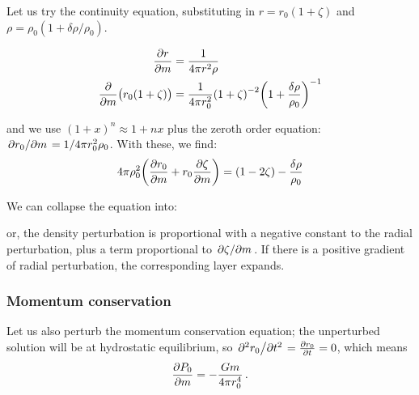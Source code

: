 \documentclass[main.tex]{subfiles}
\begin{document}
Let us try the continuity equation, substituting in \(r = r_0 (1+\zeta)\) and \(\rho = \rho_0 (1 + \delta \rho / \rho_0)\).

\begin{subequations}
\begin{align}
  \pdv{r}{m} &= \frac{1}{4 \pi r^2 \rho }  \\
  \pdv{}{m} \qty(r_0 (1+\zeta)) &=
  \frac{1}{4 \pi r_0^2} \qty(1+\zeta)^{-2} \qty(1 + \frac{\delta \rho}{\rho_0})^{-1}
\end{align}
\end{subequations}

and we use \((1+x)^n \approx 1 + nx\) plus the zeroth order equation: \(\pdv*{r_0 }{m} = 1 / 4 \pi r_0^2 \rho_0\). 
With these, we find:
%
\begin{equation}
  4 \pi \rho_0^2 \qty(\pdv{r_0}{m} (1+\zeta) + r_0 \pdv{\zeta}{m})
  = (1-2 \zeta) -\frac{\delta \rho}{\rho_0}
\end{equation}

We can collapse the equation into:

or, the density perturbation is proportional with a negative constant to the radial perturbation, plus a term proportional to \(\pdv*{\zeta}{m}\).
If there is a positive gradient of radial perturbation, the corresponding layer expands.

\subsubsection{Momentum conservation}

Let us also perturb the momentum conservation equation; the unperturbed solution will be at hydrostatic equilibrium, so \(\pdv*[2]{r_0}{t} = \pdv{r_0 }{t} =0 \), which means 
%
\begin{align} \label{eq:hydrostatic-equilibrium}
\pdv{P_0 }{m} = - \frac{Gm}{4 \pi r_0^{4}}
\,.
\end{align}
\end{document}
